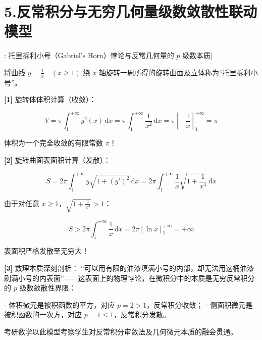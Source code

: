 \documentclass[11pt,a4paper,UTF8]{ctexart}
\begin{document}
\section{5.反常积分与无穷几何量级数敛散性联动模型}

\begin{thmbox}[模型[9]: 托里拆利小号（Gabriel's Horn）悖论与反常几何量的 $p$ 级数本质]

将曲线 $y = \frac{1}{x} \quad (x \geqslant 1)$ 绕 $x$ 轴旋转一周所得的旋转曲面及立体称为“托里拆利小号”。

\textbf{[1]} 旋转体体积计算（收敛）：

\begin{equation*}
V = \pi \int_1^{+\infty} y^2(x)\,\mathrm{d}x = \pi \int_1^{+\infty} \frac{1}{x^2}\,\mathrm{d}x = \pi \left[-\frac{1}{x}\right]_1^{+\infty} = \pi
\end{equation*}


体积为一个完全收敛的有限常数 $\pi$！

\textbf{[2]} 旋转曲面表面积计算（发散）：

\begin{equation*}
S = 2\pi \int_1^{+\infty} y\sqrt{1+(y')^2}\,\mathrm{d}x = 2\pi \int_1^{+\infty} \frac{1}{x}\sqrt{1 + \frac{1}{x^4}}\,\mathrm{d}x
\end{equation*}


由于对任意 $x \geqslant 1$，$\sqrt{1 + \frac{1}{x^4}} > 1$：


\begin{equation*}
S > 2\pi \int_1^{+\infty} \frac{1}{x}\,\mathrm{d}x = 2\pi [\ln x]_1^{+\infty} = +\infty
\end{equation*}


表面积严格发散至无穷大！

\textbf{[3]} 数理本质深刻剖析：
“可以用有限的油漆填满小号的内部，却无法用这桶油漆刷满小号的内表面”——这表面上的物理悖论，在微积分中的本质是无穷反常积分的 $p$ 级数敛散性界限：

- 体积微元是被积函数的平方，对应 $p = 2 > 1$，反常积分收敛；
- 侧面积微元是被积函数的一次方，对应 $p = 1 \leqslant 1$，反常积分发散。

考研数学以此模型考察学生对反常积分审敛法及几何微元本质的融会贯通。

\end{thmbox}
\end{document}
